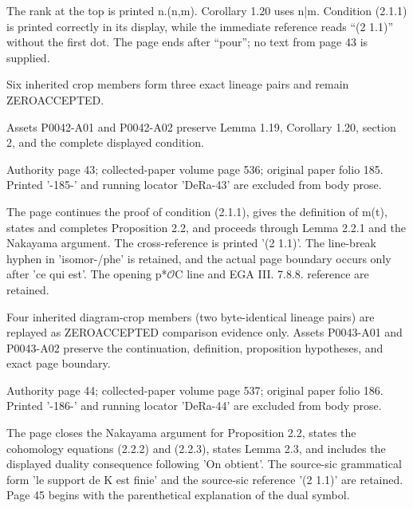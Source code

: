 \documentclass[11pt,a4paper]{article}
\begin{document}
The rank at the top is printed n.(n,m). Corollary 1.20 uses n|m. Condition (2.1.1) is printed correctly in its display, while the immediate reference reads “(2 1.1)” without the first dot. The page ends after “pour”; no text from page 43 is supplied.

Six inherited crop members form three exact lineage pairs and remain ZERO\textunderscore{}ACCEPTED.

Assets P0042-A01 and P0042-A02 preserve Lemma 1.19, Corollary 1.20, section 2, and the complete displayed condition.


\par\medskip
\hypertarget{D018-P0043}{}
\par\smallskip
Authority page 43; collected-paper volume page 536; original paper folio 185. Printed '-185-' and running locator 'DeRa-43' are excluded from body prose.

The page continues the proof of condition (2.1.1), gives the definition of m(t), states and completes Proposition 2.2, and proceeds through Lemma 2.2.1 and the Nakayama argument. The cross-reference is printed '(2 1.1)'. The line-break hyphen in 'isomor-/phe' is retained, and the actual page boundary occurs only after 'ce qui est'. The opening p\textunderscore{}*\ensuremath{\mathcal{O}}\textunderscore{}C line and EGA III. 7.8.8. reference are retained.

Four inherited diagram-crop members (two byte-identical lineage pairs) are replayed as ZERO\textunderscore{}ACCEPTED comparison evidence only. Assets P0043-A01 and P0043-A02 preserve the continuation, definition, proposition hypotheses, and exact page boundary.


\par\medskip
\hypertarget{D018-P0044}{}
\par\smallskip
Authority page 44; collected-paper volume page 537; original paper folio 186. Printed '-186-' and running locator 'DeRa-44' are excluded from body prose.

The page closes the Nakayama argument for Proposition 2.2, states the cohomology equations (2.2.2) and (2.2.3), states Lemma 2.3, and includes the displayed duality consequence following 'On obtient'. The source-sic grammatical form 'le support de K est finie' and the source-sic reference '(2 1.1)' are retained. Page 45 begins with the parenthetical explanation of the dual symbol.
\end{document}
